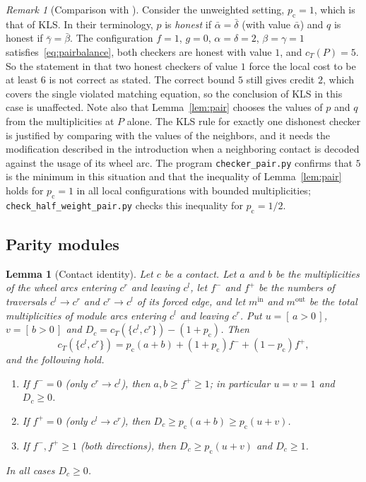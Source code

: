 \documentclass[11pt]{amsart}
\newtheorem{lemma}[theorem]{Lemma}
\theoremstyle{definition}
\theoremstyle{remark}
\newtheorem{remark}[theorem]{Remark}
\numberwithin{equation}{section}
\newcommand{\iv}[1]{[\,#1\,]}
\newcommand{\pc}{p_{\mathrm{c}}}
\begin{document}
\begin{remark}[Comparison with {\cite[\S6.3]{KLS15}}]\label{rem:kls}
Consider the unweighted setting, $\pc=1$, which is that of KLS. In their terminology, $p$ is \emph{honest} if $\bar\alpha=\bar\delta$ (with value $\bar\alpha$) and $q$ is honest if $\bar\gamma=\bar\beta$. The configuration $f=1$, $g=0$, $\alpha=\delta=2$, $\beta=\gamma=1$ satisfies~\eqref{eq:pairbalance}, both checkers are honest with value $1$, and $c_T(P)=5$. So the statement in \cite[p.~20]{KLS15} that two honest checkers of value $1$ force the local cost to be at least $6$ is not correct as stated. The correct bound $5$ still gives credit $2$, which covers the single violated matching equation, so the conclusion of KLS in this case is unaffected. Note also that Lemma~\ref{lem:pair} chooses the values of $p$ and $q$ from the multiplicities at $P$ alone. The KLS rule for exactly one dishonest checker is justified by comparing with the values of the neighbors, and it needs the modification described in the introduction when a neighboring contact is decoded against the usage of its wheel arc. The program \texttt{checker\_pair.py} confirms that $5$ is the minimum in this situation and that the inequality of Lemma~\ref{lem:pair} holds for $\pc=1$ in all local configurations with bounded multiplicities; \texttt{check\_half\_weight\_pair.py} checks this inequality for $\pc=1/2$.
\end{remark}

\subsection{Parity modules}

\begin{lemma}[Contact identity]\label{lem:contact}
Let $c$ be a contact. Let $a$ and $b$ be the multiplicities of the wheel arcs entering $c^r$ and leaving $c^l$, let $f^-$ and $f^+$ be the numbers of traversals $c^l\to c^r$ and $c^r\to c^l$ of its forced edge, and let $m^{\mathrm{in}}$ and $m^{\mathrm{out}}$ be the total multiplicities of module arcs entering $c^l$ and leaving $c^r$. Put $u=\iv{a>0}$, $v=\iv{b>0}$ and $D_c=c_T(\{c^l,c^r\})-(1+\pc)$. Then
\begin{equation}\label{eq:contactid}
c_T(\{c^l,c^r\})=\pc(a+b)+(1+\pc)f^-+(1-\pc)f^+,
\end{equation}
and the following hold.
\begin{enumerate}[label=\textup{(\roman*)},leftmargin=2.2em]
\item If $f^-=0$ (only $c^r\to c^l$), then $a,b\ge f^+\ge1$; in particular $u=v=1$ and $D_c\ge0$.
\item If $f^+=0$ (only $c^l\to c^r$), then $D_c\ge\pc(a+b)\ge\pc(u+v)$.
\item If $f^-,f^+\ge1$ (both directions), then $D_c\ge\pc(u+v)$ and $D_c\ge1$.
\end{enumerate}
In all cases $D_c\ge0$.
\end{lemma}
\end{document}
